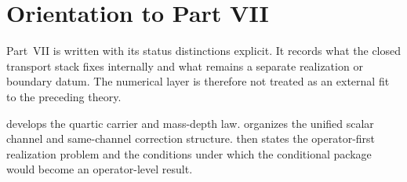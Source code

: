 \chapter*{Orientation to Part VII}
\label{part:intro-numerical}
\begin{chapterorientation}
\end{chapterorientation}

Part~VII is written with its status distinctions explicit.  It records
what the closed transport stack fixes internally and what remains a
separate realization or boundary datum.  The numerical layer is therefore
not treated as an external fit to the preceding theory.

 develops the quartic carrier and mass-depth
law.   organizes the unified scalar channel
and same-channel correction structure.  
then states the operator-first realization problem and the conditions
under which the conditional package would become an operator-level
result.
